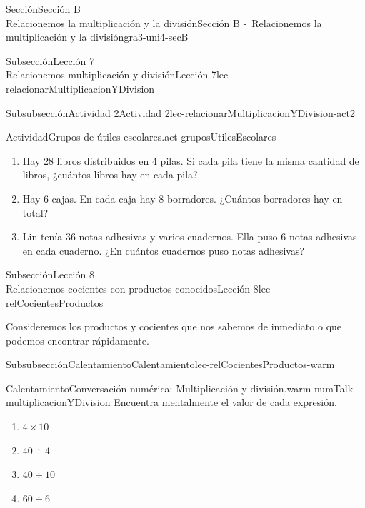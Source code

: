 \begin{sectionptx}{Sección}{{\Large Sección B\\}Relacionemos la multiplicación y la división}{}{Sección B -~Relacionemos la multiplicación y la división}{}{}{gra3-uni4-secB}
\begin{subsectionptx}{Subsección}{{\normalsize Lección 7\\[-0.05cm]}Relacionemos multiplicación y división}{}{Lección 7}{}{}{lec-relacionarMultiplicacionYDivision}
\begin{subsubsectionptx}{Subsubsección}{Actividad 2}{}{Actividad 2}{}{}{lec-relacionarMultiplicacionYDivision-act2}
\begin{activity}{Actividad}{Grupos de útiles escolares.}{act-gruposUtilesEscolares}
\begin{enumerate}
\item{}Hay 28 libros distribuidos en 4 pilas. Si cada pila tiene la misma cantidad de libros, ¿cuántos libros hay en cada pila?%
\item{}Hay 6 cajas. En cada caja hay 8 borradores. ¿Cuántos borradores hay en total?%
\item{}Lin tenía 36 notas adhesivas y varios cuadernos. Ella puso 6 notas adhesivas en cada cuaderno. ¿En cuántos cuadernos puso notas adhesivas?%
\end{enumerate}
\end{activity}%
\end{subsubsectionptx}
\end{subsectionptx}
%
%
\typeout{************************************************}
\typeout{************************************************}
%
\begin{subsectionptx}{Subsección}{{\normalsize Lección 8\\[-0.05cm]}Relacionemos cocientes con productos conocidos}{}{Lección 8}{}{}{lec-relCocientesProductos}
\begin{introduction}{}%
Consideremos los productos y cocientes que nos sabemos de inmediato o que podemos encontrar rápidamente.%
\end{introduction}%
%
%
\typeout{************************************************}
\typeout{************************************************}
%
\begin{subsubsectionptx}{Subsubsección}{Calentamiento}{}{Calentamiento}{}{}{lec-relCocientesProductos-warm}
\begin{exploration}{Calentamiento}{Conversación numérica: Multiplicación y división.}{warm-numTalk-multiplicacionYDivision}%
Encuentra mentalmente el valor de cada expresión.%
%
\begin{enumerate}[label={\Alph*.}]
\item{}\(\displaystyle 4\times 10\)%
\item{}\(\displaystyle 40\div 4\)%
\item{}\(\displaystyle 40\div 10\)%
\item{}\(\displaystyle 60\div 6\)%
\end{enumerate}
\end{exploration}%
\end{subsubsectionptx}
%
%
\typeout{************************************************}
\typeout{************************************************}

\end{subsectionptx}
\end{sectionptx}
